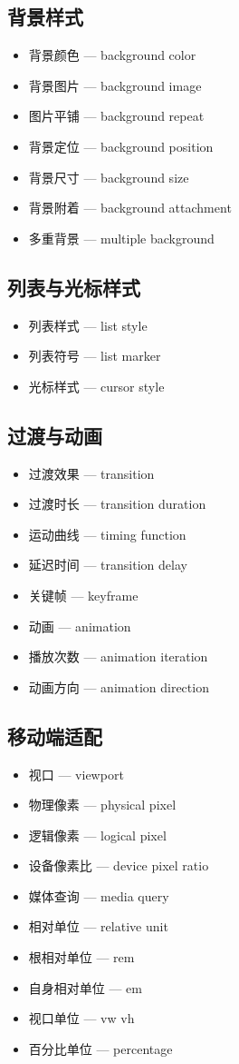 \subsection{背景样式}
\begin{itemize}
\item 背景颜色 — background color
\item 背景图片 — background image
\item 图片平铺 — background repeat
\item 背景定位 — background position
\item 背景尺寸 — background size
\item 背景附着 — background attachment
\item 多重背景 — multiple background
\end{itemize}

\subsection{列表与光标样式}
\begin{itemize}
\item 列表样式 — list style
\item 列表符号 — list marker
\item 光标样式 — cursor style
\end{itemize}

\subsection{过渡与动画}
\begin{itemize}
\item 过渡效果 — transition
\item 过渡时长 — transition duration
\item 运动曲线 — timing function
\item 延迟时间 — transition delay
\item 关键帧 — keyframe
\item 动画 — animation
\item 播放次数 — animation iteration
\item 动画方向 — animation direction
\end{itemize}

\subsection{移动端适配}
\begin{itemize}
\item 视口 — viewport
\item 物理像素 — physical pixel
\item 逻辑像素 — logical pixel
\item 设备像素比 — device pixel ratio
\item 媒体查询 — media query
\item 相对单位 — relative unit
\item 根相对单位 — rem
\item 自身相对单位 — em
\item 视口单位 — vw vh
\item 百分比单位 — percentage
\end{itemize}

